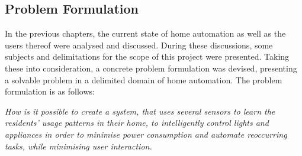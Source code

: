 \subsection{Problem Formulation}\label{problemFormulation}
In the previous chapters, the current state of home automation as well as the users thereof were analysed and discussed. During these discussions, some subjects and delimitations for the scope of this project were presented. Taking these into consideration, a concrete problem formulation was devised, presenting a solvable problem in a delimited domain of home automation. The problem formulation is as follows:

\emph{How is it possible to create a system, that uses several sensors to learn the residents’ usage patterns in their home, to intelligently control lights and appliances in order to minimise power consumption and automate reoccurring tasks, while minimising user interaction.}

